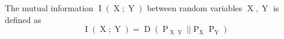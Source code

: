 The mutual information $\operatorname{I}(\operatorname{X}; \operatorname{Y})$ between random variables $\operatorname{X}, \operatorname{Y}$ is defined as
$$\operatorname{I}(\operatorname{X}; \operatorname{Y}) = \operatorname{D}(\operatorname{P}_{\operatorname{X}\operatorname{Y}} || \operatorname{P}_{\operatorname{X}} \operatorname{P}_{\operatorname{Y}})$$ 
